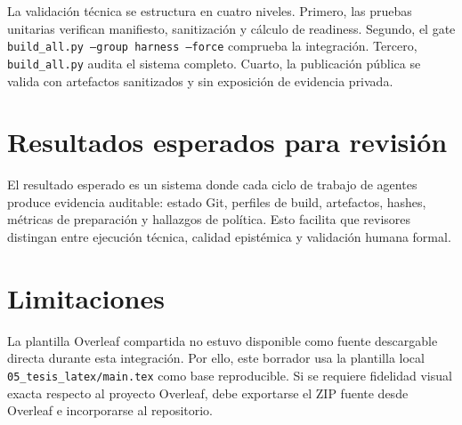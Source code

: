 La validación técnica se estructura en cuatro niveles. Primero, las pruebas unitarias verifican manifiesto, sanitización y cálculo de readiness. Segundo, el gate \texttt{build\_all.py --group harness --force} comprueba la integración. Tercero, \texttt{build\_all.py} audita el sistema completo. Cuarto, la publicación pública se valida con artefactos sanitizados y sin exposición de evidencia privada.

\section{Resultados esperados para revisión}

El resultado esperado es un sistema donde cada ciclo de trabajo de agentes produce evidencia auditable: estado Git, perfiles de build, artefactos, hashes, métricas de preparación y hallazgos de política. Esto facilita que revisores distingan entre ejecución técnica, calidad epistémica y validación humana formal.

\section{Limitaciones}

La plantilla Overleaf compartida no estuvo disponible como fuente descargable directa durante esta integración. Por ello, este borrador usa la plantilla local \texttt{05\_tesis\_latex/main.tex} como base reproducible. Si se requiere fidelidad visual exacta respecto al proyecto Overleaf, debe exportarse el ZIP fuente desde Overleaf e incorporarse al repositorio.

